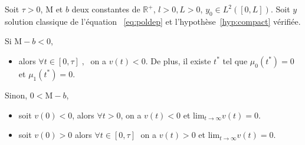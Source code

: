 \documentclass[a4paper]{article}
\newcommand{\mass}{\mathrm{M}}
\newcommand{\dep}{b}
\begin{document}
\begin{proposition}
	\label{prop:v}
	Soit $\tau>0$, $\mass$ et $\dep$ deux constantes de $\mathbb{R}^+$, 
	$l>0, L>0$, $y_0 \in L^2([0,L])$.
	Soit $y$ solution classique de l'équation ~\eqref{eq:poldep} et l'hypothèse~\eqref{hyp:compact} vérifiée.
	
	Si $\mass-\dep < 0 $,
	\begin{itemize}
		\item  alors $\forall t \in [0,\tau] \;, \;$ on a $v(t) <0$. 
		De plus, il existe $t^*$ tel que $\mu_0(t^*)=0$ et $\mu_1(t^*) = 0$. 
	\end{itemize}
	
	Sinon, $0 < \mass-\dep$,
	\begin{itemize}
	 \item soit $v(0)<0$, alors $\forall t>0 $, on a $v(t)<0$ et $\mathrm{lim}_{t \rightarrow \infty} v(t) = 0$. 
	 \item soit $v(0)>0$ alors $\forall t \in [0,\tau] \;$ on a $v(t) >0$ et $\mathrm{lim}_{t \rightarrow \infty} v(t) = 0$.
	 \end{itemize}
\end{proposition}
\end{document}
